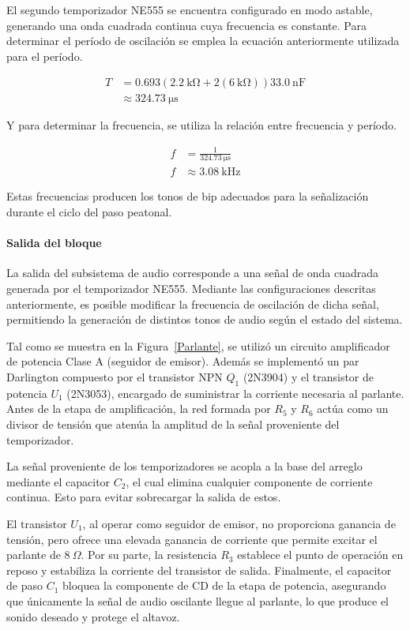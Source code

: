 \documentclass[journal, onecolumn]{IEEEtran}
\begin{document}
El segundo temporizador NE555 se encuentra configurado en modo astable, generando una
onda cuadrada continua cuya frecuencia es constante.
Para determinar el período de oscilación se emplea la ecuación anteriormente utilizada para el período.

\begin{align*}
T &= 0.693\left(\SI{2.2}{\kilo\ohm}
    + 2\left(\SI{6}{\kilo\ohm}\right)\right)
    \SI{33.0}{\nano\farad} \\
  &\approx \SI{324.73}{\micro\second}
\end{align*}

Y para determinar la frecuencia, se utiliza la relación entre frecuencia y período.

\begin{align*}
f &= \frac{1}{\SI{324.73}{\micro\second}} \\
f &\approx \SI{3.08}{\kilo\hertz}
\end{align*}

Estas frecuencias producen los tonos de bip adecuados para la señalización durante el ciclo del paso peatonal.


\paragraph{Salida del bloque}

La salida del subsistema de audio corresponde a una señal de onda 
cuadrada generada por el temporizador NE555. Mediante las configuraciones 
descritas anteriormente, es posible modificar la frecuencia de oscilación 
de dicha señal, permitiendo la generación de distintos tonos de audio 
según el estado del sistema.

Tal como se muestra en la Figura~\ref{Parlante}, se utilizó un circuito 
amplificador de potencia Clase A (seguidor de emisor). Además se implementó 
un par Darlington compuesto por el transistor NPN $Q_1$ (2N3904) y el transistor 
de potencia $U_1$ (2N3053), encargado de suministrar la corriente necesaria al parlante. 
Antes de la etapa de amplificación, la red formada por $R_5$ y $R_6$ actúa como un divisor 
de tensión que atenúa la amplitud de la señal proveniente del temporizador.

La señal proveniente de los temporizadores se acopla a la base del arreglo mediante el capacitor $C_2$, 
el cual elimina cualquier componente de corriente continua. Esto para evitar sobrecargar la salida de estos. 

El transistor $U_1$, al operar como seguidor de emisor, no proporciona 
ganancia de tensión, pero ofrece una elevada ganancia de corriente que 
permite excitar el parlante de $8~\Omega$. Por su parte, la 
resistencia $R_3$ establece el punto de operación en reposo y estabiliza 
la corriente del transistor de salida. Finalmente, el capacitor 
de paso $C_1$ bloquea la componente de CD de la etapa de potencia, asegurando 
que únicamente la señal de audio oscilante llegue al parlante, lo que produce 
el sonido deseado y protege el altavoz.
\end{document}
